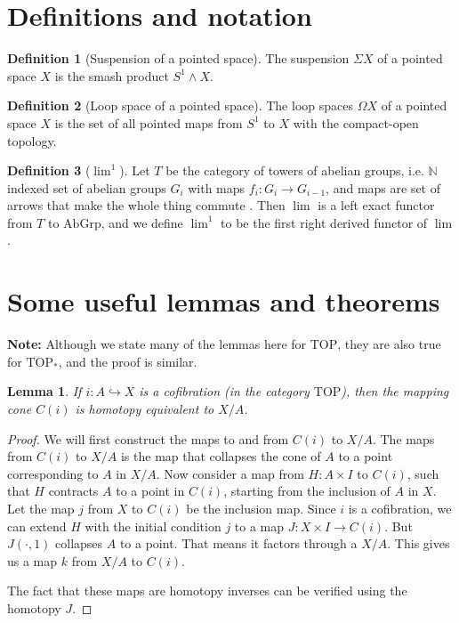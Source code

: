 \documentclass[12pt, notitlepage]{article}
\newtheorem{lem}[thm]{Lemma}
\theoremstyle{definition}
\newtheorem{defn}{Definition}[section]
\newcommand{\cat}[1]{\mathrm{#1}}
\begin{document}
\newpage

\appendix

\section{Definitions and notation}
\label{sec:definitions-notation}

\begin{defn}[Suspension of a pointed space]
  The suspension $\Sigma X$ of a pointed space $X$ is the smash product $S^1 \wedge X$.
\end{defn}

\begin{defn}[Loop space of a pointed space]
  The loop spaces $\Omega X$ of a pointed space $X$ is the set of all pointed maps from $S^1$ to $X$
  with the compact-open topology.
\end{defn}

\begin{defn}[$\lim^1$]
  Let $T$ be the category of towers of abelian groups, i.e. $\mathbb{N}$ indexed set of abelian
  groups $G_i$ with maps $f_i: G_i \to G_{i-1}$, and maps are set of arrows that make the whole
  thing commute . Then $\lim$ is a
  left exact functor from $T$ to $\cat{AbGrp}$, and we define $\lim^1$ to be the first right derived
  functor of $\lim$.
\end{defn}

\section{Some useful lemmas and theorems}
\label{sec:some-useful-lemmas}

\textbf{Note:} Although we state many of the lemmas here for $\cat{TOP}$, they are also true for
$\cat{TOP}_{\ast}$, and the proof is similar.

\begin{lem}
  If $i: A \hookrightarrow X$ is a cofibration (in the category $\cat{TOP}$), then the mapping cone
  $C(i)$ is homotopy equivalent to $X/A$.
\end{lem}

\begin{proof}
  We will first construct the maps to and from $C(i)$ to $X/A$. The maps from $C(i)$ to $X/A$ is the
  map that collapses the cone of $A$ to a point corresponding to $A$ in $X/A$. Now consider a map
  from $H: A \times I$ to $C(i)$, such that $H$ contracts $A$ to a point in $C(i)$, starting from
  the inclusion of $A$ in $X$. Let the map $j$ from $X$ to $C(i)$ be the inclusion map. Since $i$ is
  a cofibration, we can extend $H$ with the initial condition $j$ to a map $J: X \times I \to
  C(i)$. But $J(\cdot, 1)$ collapses $A$ to a point. That means it factors through a $X/A$. This
  gives us a map $k$ from $X/A$ to $C(i)$.

  The fact that these maps are homotopy inverses can be verified  using the homotopy $J$.
\end{proof}
\end{document}
